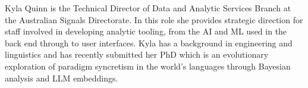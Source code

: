 Kyla Quinn is the Technical Director of Data and Analytic Services Branch at the Australian Signals Directorate. In this role she provides strategic direction for staff involved in developing analytic tooling, from the AI and ML used in the back end through to user interfaces. Kyla has a background in engineering and linguistics and has recently submitted her PhD which is an evolutionary exploration of paradigm syncretism in the world’s languages through Bayesian analysis and LLM embeddings.